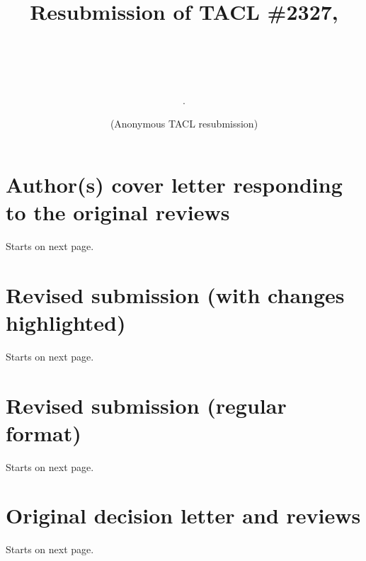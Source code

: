 \documentclass[11pt,a4paper]{article}
\title{Resubmission of TACL \#2327, \\ \subtitle.   \\}
\author{(Anonymous TACL resubmission)}
\newcommand{\coverfile}{rebuttal.pdf}  %
\newcommand{\resubmissionred}{multidomain-red.pdf}  %
\newcommand{\resubmission}{multidomain.pdf}  %
\newcommand{\origdecision}{decision.pdf}  %
\begin{document}
\maketitle

\tableofcontents

\section{Author(s) cover letter responding to the original reviews} Starts on next page.

\section{Revised submission (with changes highlighted)} Starts on next page.

\section{Revised submission (regular format)} Starts on next page.


\section{Original decision letter and reviews} Starts on next page.

\end{document}
